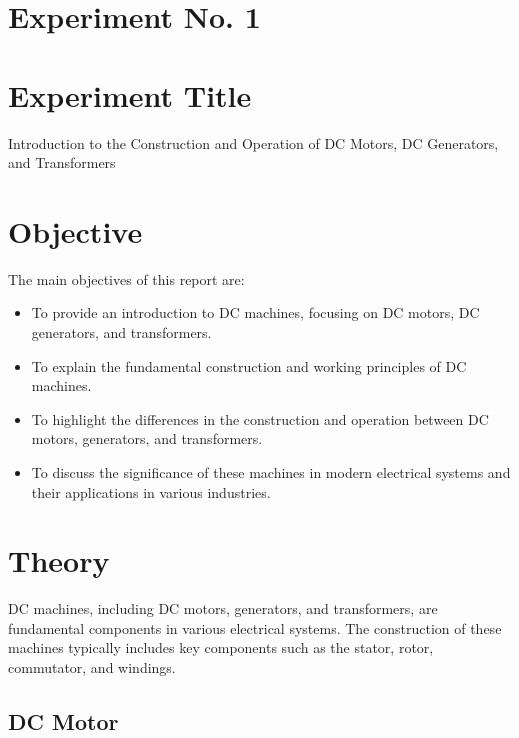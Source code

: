 \documentclass[a4paper,12pt]{article}
\begin{document}
	
	
	
	
	
	\newpage
	
	\section{Experiment No. 1}
	
	\section{Experiment Title }
	Introduction to the Construction and Operation of DC Motors, DC Generators, and Transformers
	
	
	\section{Objective}
	The main objectives of this report are:
	\begin{itemize}
		\item To provide an introduction to DC machines, focusing on DC motors, DC generators, and transformers.
		\item To explain the fundamental construction and working principles of DC machines.
		\item To highlight the differences in the construction and operation between DC motors, generators, and transformers.
		\item To discuss the significance of these machines in modern electrical systems and their applications in various industries.
	\end{itemize}
	
	
	\section{Theory}
	DC machines, including DC motors, generators, and transformers, are fundamental components in various electrical systems. The construction of these machines typically includes key components such as the stator, rotor, commutator, and windings.
	
	\subsection{DC Motor}
	
\end{document}
